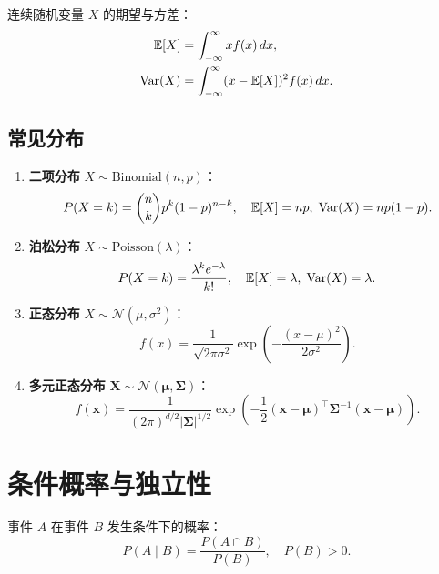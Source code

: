 \begin{definition}[期望与方差]
连续随机变量 $X$ 的期望与方差：
\begin{align}
    \mathbb{E}[X]    &= \int_{-\infty}^{\infty} x f(x)\,dx, \\
    \mathrm{Var}(X)  &= \int_{-\infty}^{\infty} (x - \mathbb{E}[X])^2 f(x)\,dx.
\end{align}
\end{definition}

\subsection{常见分布}

\begin{enumerate}[label=(\arabic*)]
    \item \textbf{二项分布} $X \sim \mathrm{Binomial}(n, p)$：
    \begin{equation}
        P(X = k) = \binom{n}{k} p^k (1-p)^{n-k},\quad \mathbb{E}[X] = np,\; \mathrm{Var}(X) = np(1-p).
    \end{equation}
    \item \textbf{泊松分布} $X \sim \mathrm{Poisson}(\lambda)$：
    \begin{equation}
        P(X = k) = \frac{\lambda^k e^{-\lambda}}{k!},\quad \mathbb{E}[X] = \lambda,\; \mathrm{Var}(X) = \lambda.
    \end{equation}
    \item \textbf{正态分布} $X \sim \mathcal{N}(\mu, \sigma^2)$：
    \begin{equation}
        f(x) = \frac{1}{\sqrt{2\pi\sigma^2}} \exp\!\left(-\frac{(x-\mu)^2}{2\sigma^2}\right).
    \end{equation}
    \item \textbf{多元正态分布} $\mathbf{X} \sim \mathcal{N}(\bm{\mu}, \bm{\Sigma})$：
    \begin{equation}
        f(\mathbf{x}) = \frac{1}{(2\pi)^{d/2}|\bm{\Sigma}|^{1/2}}
        \exp\!\left(-\frac{1}{2}(\mathbf{x}-\bm{\mu})^\top \bm{\Sigma}^{-1}(\mathbf{x}-\bm{\mu})\right).
    \end{equation}
\end{enumerate}

\section{条件概率与独立性}

\begin{definition}[条件概率]
事件 $A$ 在事件 $B$ 发生条件下的概率：
\begin{equation}
    P(A \mid B) = \frac{P(A \cap B)}{P(B)},\quad P(B) > 0.
\end{equation}
\end{definition}

